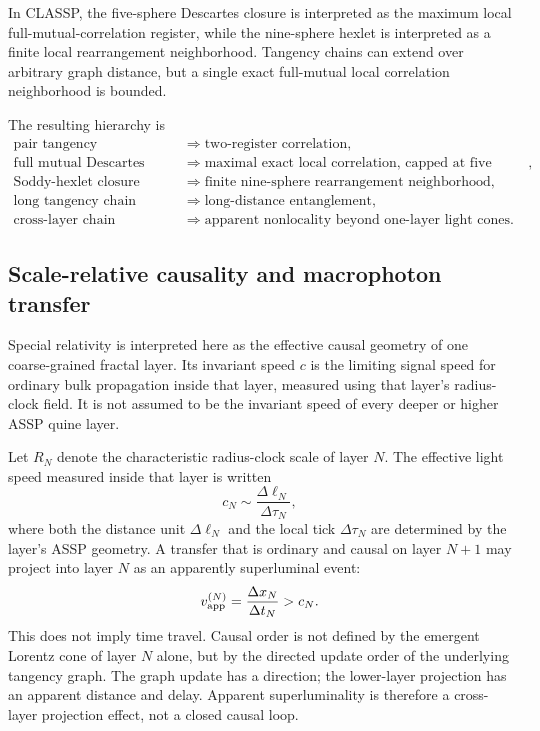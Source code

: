 \documentclass[11pt,a4paper]{article}
\begin{document}
In CLASSP, the five-sphere Descartes closure is interpreted as the maximum
local full-mutual-correlation register, while the nine-sphere hexlet is
interpreted as a finite local rearrangement neighborhood.  Tangency chains can
extend over arbitrary graph distance, but a single exact full-mutual local
correlation neighborhood is bounded.

The resulting hierarchy is
\begin{align}
  \text{pair tangency}
  &\Longrightarrow
  \text{two-register correlation}, \\
  \text{full mutual Descartes contact}
  &\Longrightarrow
  \text{maximal exact local correlation, capped at five registers}, \\
  \text{Soddy-hexlet closure}
  &\Longrightarrow
  \text{finite nine-sphere rearrangement neighborhood}, \\
  \text{long tangency chain}
  &\Longrightarrow
  \text{long-distance entanglement}, \\
  \text{cross-layer chain}
  &\Longrightarrow
  \text{apparent nonlocality beyond one-layer light cones}.
\end{align}

\subsection{Scale-relative causality and macrophoton transfer}
\label{sec:scale_relative_causality}

Special relativity is interpreted here as the effective causal geometry of one
coarse-grained fractal layer.  Its invariant speed \(c\) is the limiting
signal speed for ordinary bulk propagation inside that layer, measured using
that layer's radius-clock field.  It is not assumed to be the invariant speed
of every deeper or higher ASSP quine layer.

Let \(R_N\) denote the characteristic radius-clock scale of layer \(N\).  The
effective light speed measured inside that layer is written
\begin{equation}
  c_N\sim\frac{\Delta\ell_N}{\Delta\tau_N},
  \label{eq:layer_c}
\end{equation}
where both the distance unit \(\Delta\ell_N\) and the local tick
\(\Delta\tau_N\) are determined by the layer's ASSP geometry.  A transfer that
is ordinary and causal on layer \(N+1\) may project into layer \(N\) as an
apparently superluminal event:
\begin{equation}
  v_{\rm app}^{(N)}
  =
  \frac{\Delta x_N}{\Delta t_N}
  >
  c_N.
  \label{eq:apparent_superluminal}
\end{equation}
This does not imply time travel.  Causal order is not defined by the emergent
Lorentz cone of layer \(N\) alone, but by the directed update order of the
underlying tangency graph.  The graph update has a direction; the lower-layer
projection has an apparent distance and delay.  Apparent superluminality is
therefore a cross-layer projection effect, not a closed causal loop.
\end{document}
